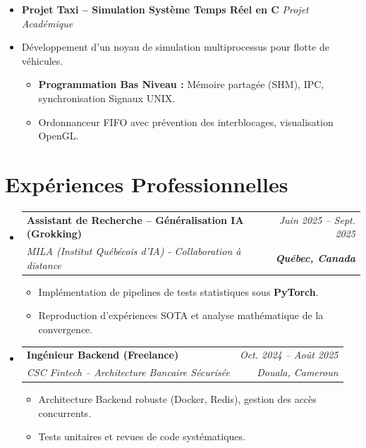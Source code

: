 \documentclass[a4paper,11pt]{article}
\makeatletter
\newcommand{\resumeSubheading}[4]{
  \vspace{-1pt}\item
    \begin{tabular*}{0.97\textwidth}[t]{l@{\extracolsep{\fill}}r}
      \textbf{#1} & \textit{\small #2} \\
      \textit{\small #3} & \textit{\small #4} \\
    \end{tabular*}\vspace{-5pt}
}
\makeatother
\begin{document}
\begin{itemize}[leftmargin=*, label={}]
\item \textbf{Projet Taxi -- Simulation Système Temps Réel en C} \hfill \textit{Projet Académique}
\vspace{-2pt}
\item \small{Développement d'un noyau de simulation multiprocessus pour flotte de véhicules.}
    \begin{itemize}[leftmargin=0.4cm, nosep, label=\tiny$\bullet$]
        \item \small{\textbf{Programmation Bas Niveau :} Mémoire partagée (SHM), IPC, synchronisation Signaux UNIX.}
        \item \small{Ordonnanceur FIFO avec prévention des interblocages, visualisation OpenGL.}
    \end{itemize}

\end{itemize}

\section{Expériences Professionnelles}
\begin{itemize}[leftmargin=*, label={}]

    \resumeSubheading
      {Assistant de Recherche -- Généralisation IA (Grokking)}{Juin 2025 -- Sept. 2025}
      {MILA (Institut Québécois d'IA) - Collaboration à distance}{\textbf{Québec, Canada}}
      \begin{itemize}[leftmargin=0.4cm, nosep, label=\tiny$\bullet$]
        \item \small{Implémentation de pipelines de tests statistiques sous \textbf{PyTorch}.}
        \item \small{Reproduction d'expériences SOTA et analyse mathématique de la convergence.}
      \end{itemize}
    \vspace{2pt}

    \resumeSubheading
      {Ingénieur Backend (Freelance)}{Oct. 2024 -- Août 2025}
      {CSC Fintech -- Architecture Bancaire Sécurisée}{Douala, Cameroun}
      \begin{itemize}[leftmargin=0.4cm, nosep, label=\tiny$\bullet$]
        \item \small{Architecture Backend robuste (Docker, Redis), gestion des accès concurrents.}
        \item \small{Tests unitaires et revues de code systématiques.}
      \end{itemize}
\end{itemize}
\end{document}
